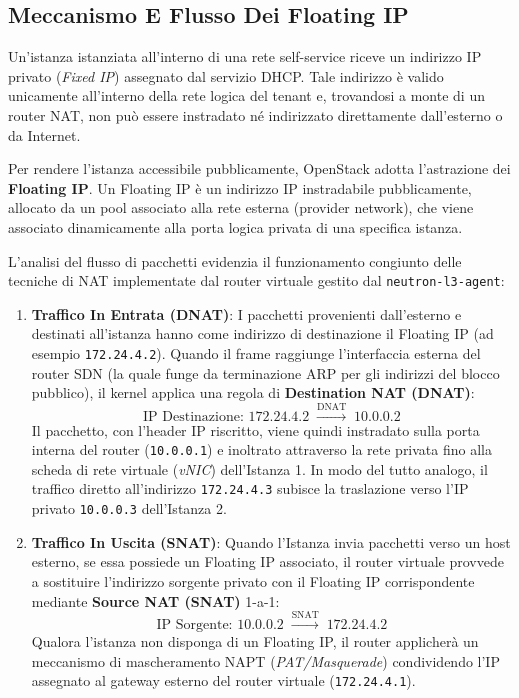 \documentclass[11pt, a4paper]{article}
\begin{document}
\subsection{Meccanismo E Flusso Dei Floating IP}

Un'istanza istanziata all'interno di una rete self-service riceve un indirizzo IP privato (\emph{Fixed IP}) assegnato dal servizio DHCP. Tale indirizzo è valido unicamente all'interno della rete logica del tenant e, trovandosi a monte di un router NAT, non può essere instradato né indirizzato direttamente dall'esterno o da Internet.

Per rendere l'istanza accessibile pubblicamente, OpenStack adotta l'astrazione dei \textbf{Floating IP}. Un Floating IP è un indirizzo IP instradabile pubblicamente, allocato da un pool associato alla rete esterna (provider network), che viene associato dinamicamente alla porta logica privata di una specifica istanza.


L'analisi del flusso di pacchetti evidenzia il funzionamento congiunto delle tecniche di NAT implementate dal router virtuale gestito dal \texttt{neutron-l3-agent}:
\begin{enumerate}
    \item \textbf{Traffico In Entrata (DNAT)}:
    I pacchetti provenienti dall'esterno e destinati all'istanza hanno come indirizzo di destinazione il Floating IP (ad esempio \texttt{172.24.4.2}). Quando il frame raggiunge l'interfaccia esterna del router SDN (la quale funge da terminazione ARP per gli indirizzi del blocco pubblico), il kernel applica una regola di \textbf{Destination NAT (DNAT)}:
    \[
        \text{IP Destinazione: } 172.24.4.2 \;\xrightarrow{\text{DNAT}}\; 10.0.0.2
    \]
    Il pacchetto, con l'header IP riscritto, viene quindi instradato sulla porta interna del router (\texttt{10.0.0.1}) e inoltrato attraverso la rete privata fino alla scheda di rete virtuale (\emph{vNIC}) dell'Istanza 1. In modo del tutto analogo, il traffico diretto all'indirizzo \texttt{172.24.4.3} subisce la traslazione verso l'IP privato \texttt{10.0.0.3} dell'Istanza 2.
    \item \textbf{Traffico In Uscita (SNAT)}:
    Quando l'Istanza invia pacchetti verso un host esterno, se essa possiede un Floating IP associato, il router virtuale provvede a sostituire l'indirizzo sorgente privato con il Floating IP corrispondente mediante \textbf{Source NAT (SNAT)} 1-a-1:
    \[
        \text{IP Sorgente: } 10.0.0.2 \;\xrightarrow{\text{SNAT}}\; 172.24.4.2
    \]
    Qualora l'istanza non disponga di un Floating IP, il router applicherà un meccanismo di mascheramento NAPT (\emph{PAT/Masquerade}) condividendo l'IP assegnato al gateway esterno del router virtuale (\texttt{172.24.4.1}).
\end{enumerate}
\end{document}
